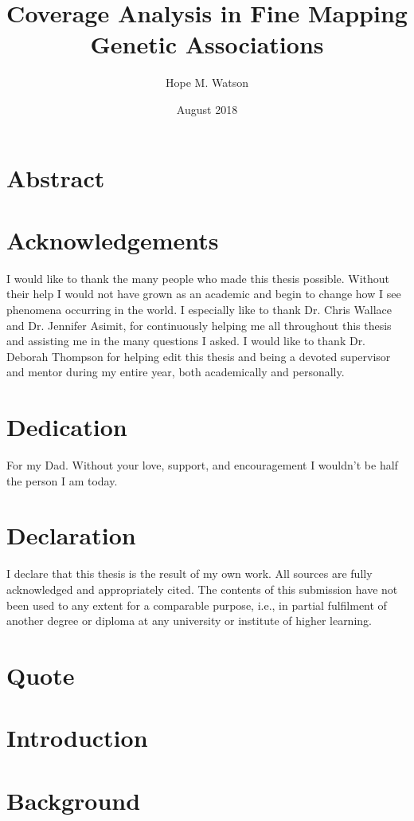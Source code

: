 \documentclass[12pt,twoside]{report}
\title{Coverage Analysis in Fine Mapping Genetic Associations}
\author{Hope M. Watson }
\date{August 2018}
\begin{document}


\chapter*{Abstract}


\chapter*{Acknowledgements}
I would like to thank the many people who made this thesis possible. Without their help I would not have grown as an academic and begin to change how I see phenomena occurring in the world. I especially like to thank Dr. Chris Wallace and Dr. Jennifer Asimit, for continuously helping me all throughout this thesis and assisting me in the many questions I asked. I would like to thank Dr. Deborah Thompson for helping edit this thesis and being a devoted supervisor and mentor during my entire year, both academically and personally. 
\chapter*{Dedication}
For my Dad. Without your love, support, and encouragement I wouldn't be half the person I am today.

\chapter*{Declaration}
I declare that this thesis is the result of my own work. All sources are fully acknowledged and
appropriately cited. The contents of this submission have not been used to any extent for a comparable
purpose, i.e., in partial fulfilment of another degree or diploma at any university or institute of
higher learning.

\chapter*{Quote}

\tableofcontents 
\listoffigures

\chapter{Introduction}


\chapter{Background}

\end{document}
